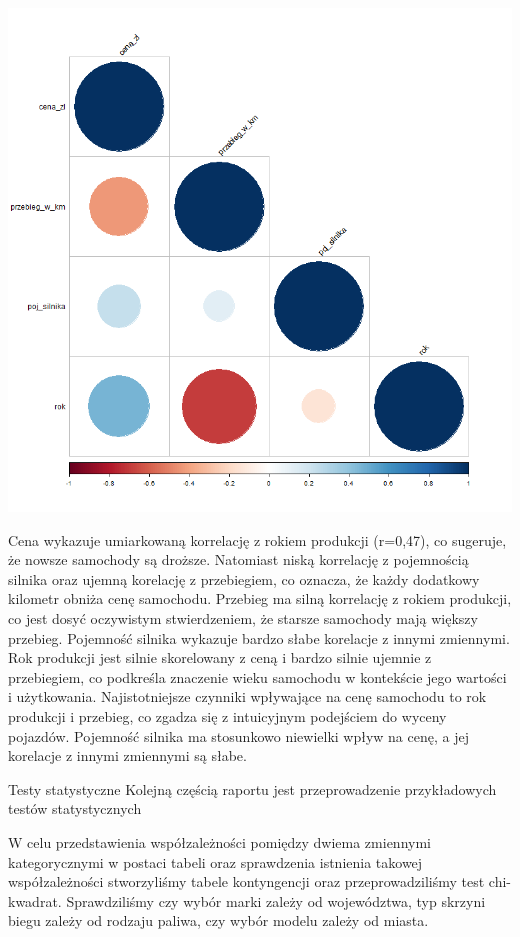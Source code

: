 \documentclass[
]{article}
\begin{document}
\includegraphics[width=1\linewidth]{analiza/wykres_korelacji}

Cena wykazuje umiarkowaną korrelację z rokiem produkcji (r=0,47), co
sugeruje, że nowsze samochody są droższe. Natomiast niską korrelację z
pojemnością silnika oraz ujemną korelację z przebiegiem, co oznacza, że
każdy dodatkowy kilometr obniża cenę samochodu. Przebieg ma silną
korrelację z rokiem produkcji, co jest dosyć oczywistym stwierdzeniem,
że starsze samochody mają większy przebieg. Pojemność silnika wykazuje
bardzo słabe korelacje z innymi zmiennymi. Rok produkcji jest silnie
skorelowany z ceną i bardzo silnie ujemnie z przebiegiem, co podkreśla
znaczenie wieku samochodu w kontekście jego wartości i użytkowania.
Najistotniejsze czynniki wpływające na cenę samochodu to rok produkcji i
przebieg, co zgadza się z intuicyjnym podejściem do wyceny pojazdów.
Pojemność silnika ma stosunkowo niewielki wpływ na cenę, a jej korelacje
z innymi zmiennymi są słabe.

Testy statystyczne Kolejną częścią raportu jest przeprowadzenie
przykładowych testów statystycznych

W celu przedstawienia współzależności pomiędzy dwiema zmiennymi
kategorycznymi w postaci tabeli oraz sprawdzenia istnienia takowej
współzależności stworzyliśmy tabele kontyngencji oraz przeprowadziliśmy
test chi-kwadrat. Sprawdziliśmy czy wybór marki zależy od województwa,
typ skrzyni biegu zależy od rodzaju paliwa, czy wybór modelu zależy od
miasta.
\end{document}
